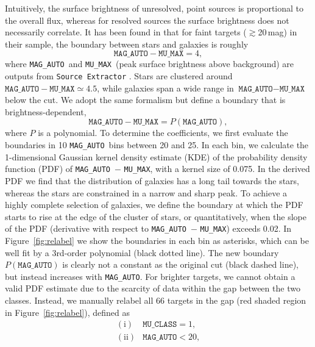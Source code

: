 \documentclass[twocolumn]{aastex631}
\newcommand{\magauto}{\texttt{MAG\_AUTO}}
\newcommand{\mumax}{\texttt{MU\_MAX}}
\begin{document}
\begin{CJK*}{UTF8}{gbsn}
Intuitively, the surface brightness of unresolved, point sources is proportional to the overall flux, whereas for resolved sources the surface brightness does not necessarily correlate. It has been found in \cite{Leauthaud_2007} that for faint targets ($\gtrsim$20\,mag) in their sample, the boundary between stars and galaxies is roughly
\begin{equation*}
\texttt{MAG\_AUTO} - \texttt{MU\_MAX} = 4,
\end{equation*}
where \magauto\ and \mumax\ (peak surface brightness above background) are outputs from \texttt{Source Extractor} \citep{SExtractor_1996}. Stars are clustered around $\texttt{MAG\_AUTO} - \texttt{MU\_MAX} \simeq 4.5$, while galaxies span a wide range in $\texttt{MAG\_AUTO} - \texttt{MU\_MAX}$ below the cut. We adopt the same formalism but define a boundary that is brightness-dependent,
\begin{equation}\label{eq:bd}
    \texttt{MAG\_AUTO} - \texttt{MU\_MAX} = P(\texttt{MAG\_AUTO}),
\end{equation}
where $P$ is a polynomial. To determine the coefficients, we first evaluate the boundaries in 10 \magauto\ bins between 20 and 25. In each bin, we calculate the 1-dimensional Gaussian kernel density estimate (KDE) of the probability density function (PDF) of \magauto\ $-$ \mumax, with a kernel size of 0.075. In the derived PDF we find that the distribution of galaxies has a long tail towards the stars, whereas the stars are constrained in a narrow and sharp peak. To achieve a highly complete selection of galaxies, we define the boundary at which the PDF starts to rise at the edge of the cluster of stars, or quantitatively, when the slope of the PDF (derivative with respect to \magauto\ $-$ \mumax) exceeds 0.02. In Figure~\ref{fig:relabel} we show the boundaries in each bin as asterisks, which can be well fit by a 3rd-order polynomial (black dotted line). The new boundary $P(\texttt{MAG\_AUTO})$ is clearly not a constant as the original cut (black dashed line), but instead increases with \magauto. For brighter targets, we cannot obtain a valid PDF estimate due to the scarcity of data within the gap between the two classes. Instead, we manually relabel all 66 targets in the gap (red shaded region in Figure~\ref{fig:relabel}), defined as
\begin{equation}\label{eq:VI}
    \left.\begin{array}{cc}
         \mathrm{(i)} & \texttt{MU\_CLASS} = 1,\\
         \mathrm{(ii)} & \texttt{MAG\_AUTO} < 20,\\

\end{array}
\end{equation}
\end{CJK*}
\end{document}
